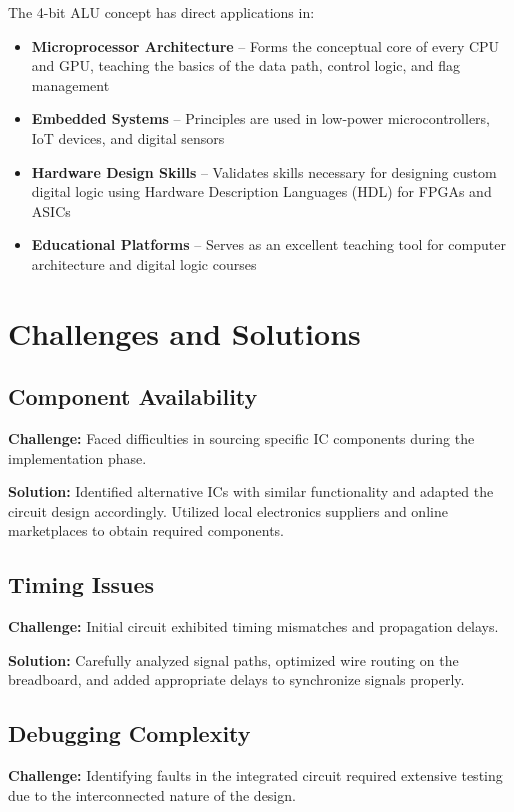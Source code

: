 The 4-bit ALU concept has direct applications in:
\begin{itemize}
    \item \textbf{Microprocessor Architecture} -- Forms the conceptual core of every CPU and GPU, teaching the basics of the data path, control logic, and flag management
    \item \textbf{Embedded Systems} -- Principles are used in low-power microcontrollers, IoT devices, and digital sensors
    \item \textbf{Hardware Design Skills} -- Validates skills necessary for designing custom digital logic using Hardware Description Languages (HDL) for FPGAs and ASICs
    \item \textbf{Educational Platforms} -- Serves as an excellent teaching tool for computer architecture and digital logic courses
\end{itemize}

\section{Challenges and Solutions}

\subsection{Component Availability}
\textbf{Challenge:} Faced difficulties in sourcing specific IC components during the implementation phase.

\textbf{Solution:} Identified alternative ICs with similar functionality and adapted the circuit design accordingly. Utilized local electronics suppliers and online marketplaces to obtain required components.

\subsection{Timing Issues}
\textbf{Challenge:} Initial circuit exhibited timing mismatches and propagation delays.

\textbf{Solution:} Carefully analyzed signal paths, optimized wire routing on the breadboard, and added appropriate delays to synchronize signals properly.

\subsection{Debugging Complexity}
\textbf{Challenge:} Identifying faults in the integrated circuit required extensive testing due to the interconnected nature of the design.

